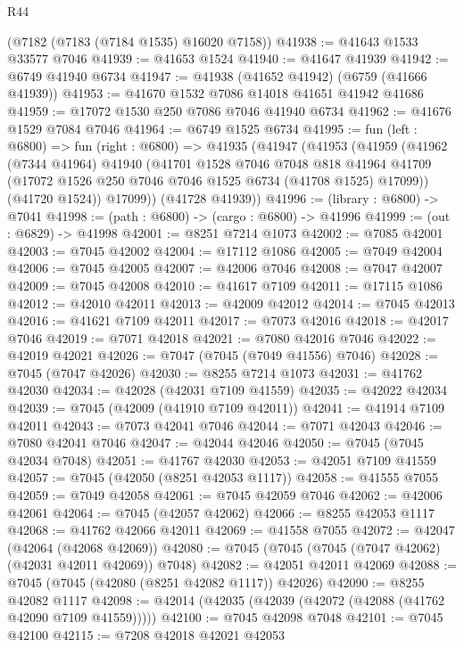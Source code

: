 \begin{lexlean}{R44}
\begin{coremodule}
{    (@7182 (@7183 (@7184 @1535) @16020 @7158))
@41938 := @41643 @1533 @33577 @7046
@41939 := @41653 @1524
@41940 := @41647 @41939
@41942 := @6749 @41940 @6734
@41947 := @41938 (@41652 @41942) (@6759 (@41666 @41939))
@41953 := @41670 @1532 @7086 @14018 @41651 @41942 @41686
@41959 := @17072 @1530 @250 @7086 @7046 @41940 @6734
@41962 := @41676 @1529 @7084 @7046
@41964 := @6749 @1525 @6734
@41995 := fun (left : @6800) =>
  fun (right : @6800) =>
  @41935
    (@41947
      (@41953
        (@41959
          (@41962
            (@7344 @41964)
            @41940
            (@41701
              @1528
              @7046
              @7048
              @818
              @41964
              @41709
              (@17072 @1526 @250 @7046 @7046 @1525 @6734 (@41708 @1525) @17099))
            (@41720 @1524))
          @17099))
      (@41728 @41939))
@41996 := (library : @6800) -> @7041
@41998 := (path : @6800) -> (cargo : @6800) -> @41996
@41999 := (out : @6829) -> @41998
@42001 := @8251 @7214 @1073
@42002 := @7085 @42001
@42003 := @7045 @42002
@42004 := @17112 @1086
@42005 := @7049 @42004
@42006 := @7045 @42005
@42007 := @42006 @7046
@42008 := @7047 @42007
@42009 := @7045 @42008
@42010 := @41617 @7109
@42011 := @17115 @1086
@42012 := @42010 @42011
@42013 := @42009 @42012
@42014 := @7045 @42013
@42016 := @41621 @7109 @42011
@42017 := @7073 @42016
@42018 := @42017 @7046
@42019 := @7071 @42018
@42021 := @7080 @42016 @7046
@42022 := @42019 @42021
@42026 := @7047 (@7045 (@7049 @41556) @7046)
@42028 := @7045 (@7047 @42026)
@42030 := @8255 @7214 @1073
@42031 := @41762 @42030
@42034 := @42028 (@42031 @7109 @41559)
@42035 := @42022 @42034
@42039 := @7045 (@42009 (@41910 @7109 @42011))
@42041 := @41914 @7109 @42011
@42043 := @7073 @42041 @7046
@42044 := @7071 @42043
@42046 := @7080 @42041 @7046
@42047 := @42044 @42046
@42050 := @7045 (@7045 @42034 @7048)
@42051 := @41767 @42030
@42053 := @42051 @7109 @41559
@42057 := @7045 (@42050 (@8251 @42053 @1117))
@42058 := @41555 @7055
@42059 := @7049 @42058
@42061 := @7045 @42059 @7046
@42062 := @42006 @42061
@42064 := @7045 (@42057 @42062)
@42066 := @8255 @42053 @1117
@42068 := @41762 @42066 @42011
@42069 := @41558 @7055
@42072 := @42047 (@42064 (@42068 @42069))
@42080 := @7045 (@7045 (@7045 (@7047 @42062) (@42031 @42011 @42069)) @7048)
@42082 := @42051 @42011 @42069
@42088 := @7045 (@7045 (@42080 (@8251 @42082 @1117)) @42026)
@42090 := @8255 @42082 @1117
@42098 := @42014 (@42035 (@42039 (@42072 (@42088 (@41762 @42090 @7109 @41559)))))
@42100 := @7045 @42098 @7048
@42101 := @7045 @42100
@42115 := @7208
    @42018
    @42021
    @42053
}
\end{coremodule}
\end{lexlean}

